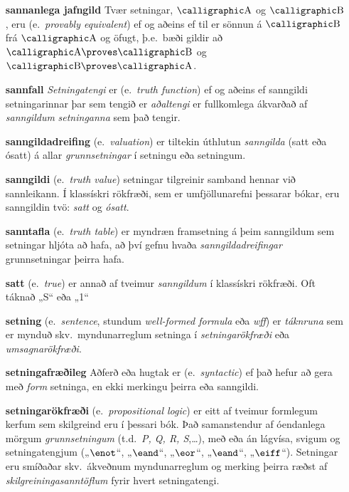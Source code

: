 \begin{enumerate}[leftmargin=35pt]
	\item[\textbf{sannanlega jafngild}] Tvær setningar, $\meta{A}$ og $\meta{B}$, eru  (e.\ \emph{provably equivalent}) ef og aðeins ef til er sönnun á $\meta{B}$ frá $\meta{A}$ og öfugt, þ.e.\ bæði gildir að $\meta{A} \proves \meta{B}$ og $\meta{B} \proves \meta{A}$.
		
	\item[\textbf{sannfall}] \emph{Setningatengi} er  (e.\ \emph{truth function}) ef og aðeins ef sanngildi setningarinnar þar sem tengið er \emph{aðaltengi} er fullkomlega ákvarðað af \emph{sanngildum} \emph{setninganna} sem það tengir.
	
	\item[\textbf{sanngildadreifing}] (e.\ \emph{valuation}) er tiltekin úthlutun \emph{sanngilda} (satt eða ósatt) á allar \emph{grunnsetningar} í setningu eða setningum.
	
	\item[\textbf{sanngildi}] (e.\ \emph{truth value}) setningar tilgreinir samband hennar við sannleikann. Í klassískri rökfræði, sem er umfjöllunarefni þessarar bókar, eru sanngildin tvö: \emph{satt} og \emph{ósatt}.
	
	\item[\textbf{sanntafla}] (e.\ \emph{truth table}) er myndræn framsetning á þeim sanngildum sem setningar hljóta að hafa, að því gefnu hvaða \emph{sanngildadreifingar} grunnsetningar þeirra hafa.
	
	\item[\textbf{satt}] (e.\ \emph{true}) er annað af tveimur \emph{sanngildum} í klassískri rökfræði. Oft táknað „S“ eða „1“
	
	\item[\textbf{setning}] (e.\ \emph{sentence}, stundum \emph{well-formed formula} eða \emph{wff}) er \emph{táknruna} sem er mynduð skv.\ myndunarreglum setninga í \emph{setningarökfræði} eða \emph{umsagnarökfræði}.
	
	\item[\textbf{setningafræðileg}] Aðferð eða hugtak er  (e.\ \emph{syntactic}) ef það hefur að gera með \emph{form} setninga, en ekki merkingu þeirra eða sanngildi.
	
	\item[\textbf{setningarökfræði}] (e.\ \emph{propositional logic}) er eitt af tveimur formlegum kerfum sem skilgreind eru í þessari bók. Það samanstendur af óendanlega mörgum \emph{grunnsetningum} (t.d.\ \emph{P, Q, R, S},\ldots), með eða án lágvísa, svigum og setningatengjum („$\enot$“, „$\eand$“, „$\eor$“, „$\eand$“, „$\eiff$“). Setningar eru smíðaðar skv.\ ákveðnum myndunarreglum og merking þeirra ræðst af \emph{skilgreiningasanntöflum} fyrir hvert setningatengi.
	

\end{enumerate}
